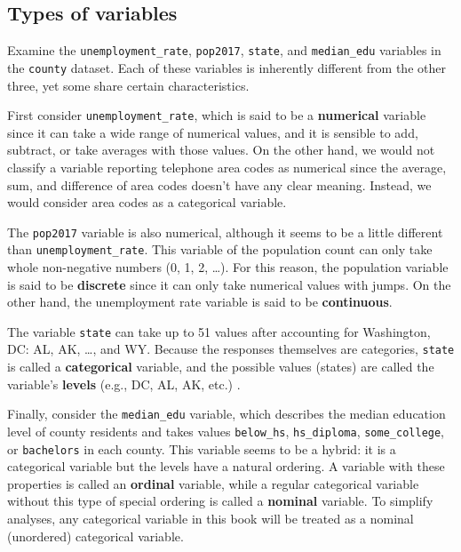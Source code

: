 \documentclass[
  10pt,
  openany]{book}
\begin{document}
\hypertarget{variable-types}{%
\subsection{Types of variables}\label{variable-types}}

Examine the \texttt{unemployment\_rate}, \texttt{pop2017}, \texttt{state}, and \texttt{median\_edu} variables in the \texttt{county} dataset.
Each of these variables is inherently different from the other three, yet some share certain characteristics.

First consider \texttt{unemployment\_rate}, which is said to be a \textbf{numerical} variable since it can take a wide range of numerical values, and it is sensible to add, subtract, or take averages with those values.
On the other hand, we would not classify a variable reporting telephone area codes as numerical since the average, sum, and difference of area codes doesn't have any clear meaning.
Instead, we would consider area codes as a categorical variable.

The \texttt{pop2017} variable is also numerical, although it seems to be a little different than \texttt{unemployment\_rate}.
This variable of the population count can only take whole non-negative numbers (0, 1, 2, \ldots).
For this reason, the population variable is said to be \textbf{discrete} since it can only take numerical values with jumps.
On the other hand, the unemployment rate variable is said to be \textbf{continuous}.

The variable \texttt{state} can take up to 51 values after accounting for Washington, DC: AL, AK, \ldots, and WY.
Because the responses themselves are categories, \texttt{state} is called a \textbf{categorical} variable, and the possible values (states) are called the variable's \textbf{levels} (e.g., DC, AL, AK, etc.) .

Finally, consider the \texttt{median\_edu} variable, which describes the median education level of county residents and takes values \texttt{below\_hs}, \texttt{hs\_diploma}, \texttt{some\_college}, or \texttt{bachelors} in each county.
This variable seems to be a hybrid: it is a categorical variable but the levels have a natural ordering.
A variable with these properties is called an \textbf{ordinal} variable, while a regular categorical variable without this type of special ordering is called a \textbf{nominal} variable.
To simplify analyses, any categorical variable in this book will be treated as a nominal (unordered) categorical variable.
\end{document}
